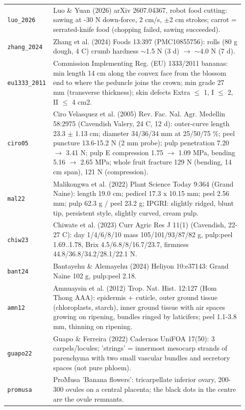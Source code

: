 \documentclass[10.5pt,a4paper]{article}
\begin{document}
{\begin{longtable}{@{}p{0.16\linewidth}p{0.8\linewidth}@{}}
\texttt{luo\_\allowbreak{}2026} & Luo \& Yuan (2026) arXiv 2607.04367, robot food cutting: sawing at -30 N down-force, 2 cm/s, $\pm$2 cm strokes; carrot = serrated-knife food (chopping failed, sawing succeeded). \\
\texttt{zhang\_\allowbreak{}2024} & Zhang et al. (2024) Foods 13:397 (PMC10855756): rolls (80 g dough, 4 C) crumb hardness $\sim$1.5 N (3 d) $\to$ $\sim$4.0 N (7 d). \\
\texttt{eu1333\_\allowbreak{}2011} & Commission Implementing Reg. (EU) 1333/2011 bananas: min length 14 cm along the convex face from the blossom end to where the peduncle joins the crown; min grade 27 mm (transverse thickness); skin defects Extra $\le$ 1, I $\le$ 2, II $\le$ 4 cm2. \\
\texttt{ciro05} & Ciro Velasquez et al. (2005) Rev. Fac. Nal. Agr. Medellin 58:2975 (Cavendish Valery, 24 C, 12 d): outer-curve length 23.3 $\pm$ 1.13 cm; diameter 34/36/34 mm at 25/50/75 \%; peel puncture 13.6-15.2 N (2 mm probe); pulp penetration 7.20 $\to$ 3.41 N; pulp E compression 1.75 $\to$ 1.09 MPa, bending 5.16 $\to$ 2.65 MPa; whole fruit fracture 129 N (bending, 14 cm span), 121 N (compression). \\
\texttt{mal22} & Malikongwa et al. (2022) Plant Science Today 9:364 (Grand Naine): length 19.0 cm; pedicel 17.3 x 10.15 mm; peel 2.56 mm; pulp 62.3 g / peel 23.2 g; IPGRI: slightly ridged, blunt tip, persistent style, slightly curved, cream pulp. \\
\texttt{chiw23} & Chiwate et al. (2023) Curr Agric Res J 11(1) (Cavendish, 22-27 C): day 1/4/6/8/10 mass 105/101/93/87/82 g, pulp:peel 1.69..1.78, Brix 4.5/6.8/8/16.7/23.7, firmness 44.8/36.8/34.2/28.1/22.1 N. \\
\texttt{bant24} & Bantayehu \& Alemayehu (2024) Heliyon 10:e37143: Grand Naine 102 g, pulp:peel 2.18. \\
\texttt{amn12} & Amnuaysin et al. (2012) Trop. Nat. Hist. 12:127 (Hom Thong AAA): epidermis + cuticle, outer ground tissue (chloroplasts, starch), inner ground tissue with air spaces growing on ripening, bundles ringed by laticifers; peel 1.1-3.8 mm, thinning on ripening. \\
\texttt{guapo22} & Guapo \& Ferreira (2022) Cadernos UniFOA 17(50): 3 carpels/locules; 'strings' = innermost mesocarp strands of parenchyma with two small vascular bundles and secretory spaces (not pure phloem). \\
\texttt{promusa} & ProMusa 'Banana flowers': tricarpellate inferior ovary, 200-300 ovules on a central placenta; the black dots in the centre are the ovule remnants. \\

\end{longtable}}
\end{document}
